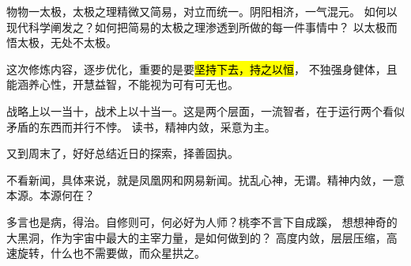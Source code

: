 物物一太极，太极之理精微又简易，对立而统一。阴阳相济，一气混元。
如何以现代科学阐发之？如何把简易的太极之理渗透到所做的每一件事情中？
以太极而悟太极，无处不太极。

这次修炼内容，逐步优化，重要的是要\hl{坚持下去，持之以恒}，
不独强身健体，且能涵养心性，开慧益智，不能视为可有可无也。

战略上以一当十，战术上以十当一。这是两个层面，一流智者，在于运行两个看似矛盾的东西而并行不悖。
读书，精神内敛，采意为主。

又到周末了，好好总结近日的探索，择善固执。

不看新闻，具体来说，就是凤凰网和网易新闻。扰乱心神，无谓。精神内敛，一意本源。本源何在？

多言也是病，得治。自修则可，何必好为人师？桃李不言下自成蹊，
想想神奇的大黑洞，作为宇宙中最大的主宰力量，是如何做到的？
高度内敛，层层压缩，高速旋转，什么也不需要做，而众星拱之。
